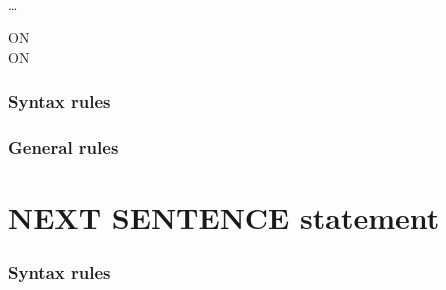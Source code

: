 \begin{syntax}
  \begin{1=}
    \identifier \\
    \literal
  \end{1=}
  \begin{1=}
    \identifier \\
    \literal
  \end{1=}

  \begin{1=}
    \begin{1=}
      \identifier \\
      \literal
    \end{1=}
    \begin{0-1}
    \end{0-1}
  \end{1=} \ldots

  \begin{0+}
    ON   \imperativestatement \\
     ON   \imperativestatement
  \end{0+}

  \begin{0-1}
  \end{0-1}
\end{syntax}

\subsubsection{Syntax rules}

\subsubsection{General rules}

\section{NEXT SENTENCE statement}

\begin{syntax}[\archaiccolour]
     
\end{syntax}

\subsubsection{Syntax rules}

